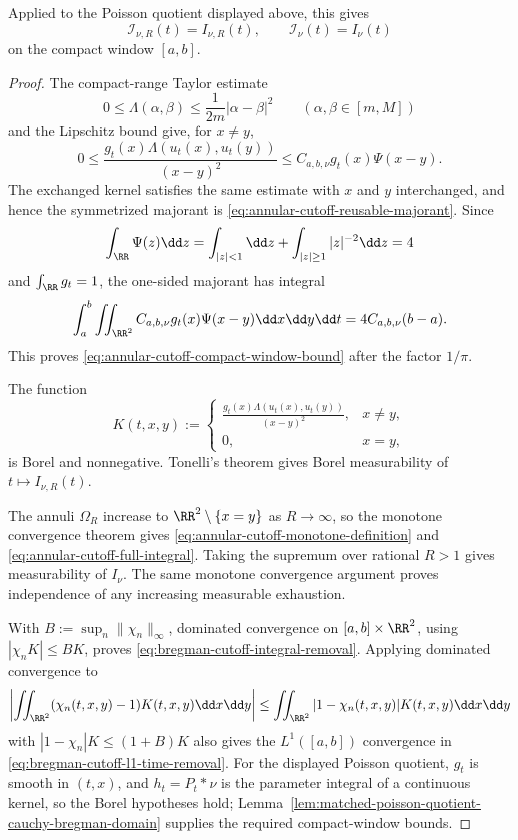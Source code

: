 \begin{lemma}
Applied to the Poisson quotient displayed above, this gives
\[
\mathcal I_{\nu,R}(t)=I_{\nu,R}(t),\qquad
\mathcal I_\nu(t)=I_\nu(t)
\]
on the compact window \([a,b]\).
\end{lemma}

\begin{proof}
The compact-range Taylor estimate
\[
0\le\Lambda(\alpha,\beta)\le\frac{1}{2m}|\alpha-\beta|^2
\qquad(\alpha,\beta\in[m,M])
\]
and the Lipschitz bound give, for \(x\ne y\),
\[
0\le
\frac{g_t(x)\Lambda(u_t(x),u_t(y))}{(x-y)^2}
\le C_{a,b,\nu}g_t(x)\Psi(x-y).
\]
The exchanged kernel satisfies the same estimate with \(x\) and \(y\)
interchanged, and hence the symmetrized majorant is
\eqref{eq:annular-cutoff-reusable-majorant}.  Since
\[
\int_{\RR}\Psi(z)\dd z
=\int_{|z|<1}\dd z+\int_{|z|\ge1}|z|^{-2}\dd z=4
\]
and \(\int_{\RR}g_t=1\), the one-sided majorant has integral
\[
\int_a^b\iint_{\RR^2}C_{a,b,\nu}g_t(x)\Psi(x-y)\dd x\dd y\dd t
=4C_{a,b,\nu}(b-a).
\]
This proves \eqref{eq:annular-cutoff-compact-window-bound} after the factor
\(1/\pi\).

The function
\[
K(t,x,y):=
\begin{cases}
\displaystyle
\frac{g_t(x)\Lambda(u_t(x),u_t(y))}{(x-y)^2},&x\ne y,\\[1ex]
0,&x=y,
\end{cases}
\]
is Borel and nonnegative.  Tonelli's theorem gives Borel measurability of
\(t\mapsto I_{\nu,R}(t)\).

The annuli \(\Omega_R\) increase to \(\RR^2\setminus\{x=y\}\) as
\(R\to\infty\), so the monotone convergence theorem gives
\eqref{eq:annular-cutoff-monotone-definition} and
\eqref{eq:annular-cutoff-full-integral}.  Taking the supremum over rational
\(R>1\) gives measurability of \(I_\nu\).  The same monotone convergence
argument proves independence of any increasing measurable exhaustion.

With \(B:=\sup_n\|\chi_n\|_\infty\), dominated convergence on
\([a,b]\times\RR^2\), using \(|\chi_nK|\le BK\), proves
\eqref{eq:bregman-cutoff-integral-removal}.  Applying dominated convergence
to
\[
\left|\iint_{\RR^2}(\chi_n(t,x,y)-1)K(t,x,y)\dd x\dd y\right|
\le \iint_{\RR^2}|1-\chi_n(t,x,y)|K(t,x,y)\dd x\dd y
\]
with \(|1-\chi_n|K\le(1+B)K\) also gives the \(L^1([a,b])\) convergence in
\eqref{eq:bregman-cutoff-l1-time-removal}.  For the displayed Poisson
quotient, \(g_t\) is smooth in \((t,x)\), and \(h_t=P_t*\nu\) is the
parameter integral of a continuous kernel, so the Borel hypotheses hold;
Lemma~\ref{lem:matched-poisson-quotient-cauchy-bregman-domain} supplies the
required compact-window bounds.
\end{proof}


